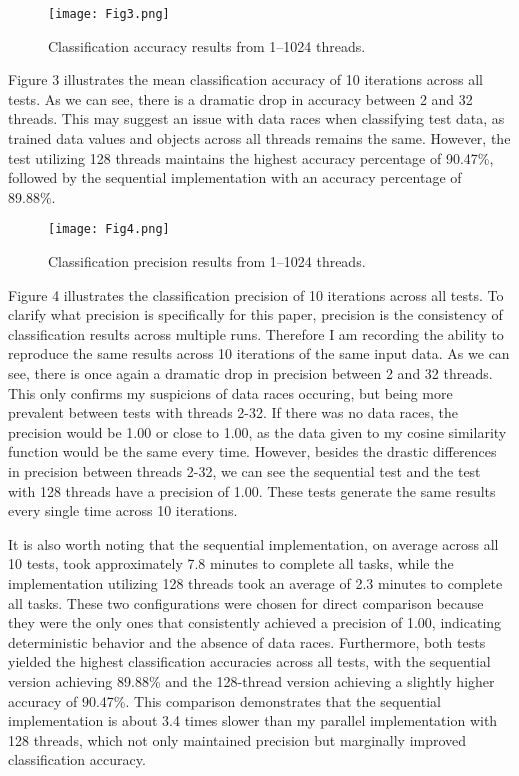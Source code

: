 \documentclass[conference]{IEEEtran}
\begin{document}
\begin{figure}[htbp]
\centerline{\texttt{[image: Fig3.png]}}
\caption{Classification accuracy results from 1--1024 threads.}
\label{fig}
\end{figure}

Figure 3 illustrates the mean classification accuracy of 10 iterations across all tests. As we can see, there is a dramatic drop in accuracy between 2 and 32 threads. This may suggest an issue with data races when classifying test data, as trained data values and objects across all threads remains the same. However, the test utilizing 128 threads maintains the highest accuracy percentage of 90.47\%, followed by the sequential implementation with an accuracy percentage of 89.88\%. 

\begin{figure}[htbp]
\centerline{\texttt{[image: Fig4.png]}}
\caption{Classification precision results from 1--1024 threads.}
\label{fig}
\end{figure}

Figure 4 illustrates the classification precision of 10 iterations across all tests. To clarify what precision is specifically for this paper, precision is the consistency of classification results across multiple runs. Therefore I am recording the ability to reproduce the same results across 10 iterations of the same input data. As we can see, there is once again a dramatic drop in precision between 2 and 32 threads. This only confirms my suspicions of data races occuring, but being more prevalent between tests with threads 2-32. If there was no data races, the precision would be 1.00 or close to 1.00, as the data given to my cosine similarity function would be the same every time. However, besides the drastic differences in precision between threads 2-32, we can see the sequential test and the test with 128 threads have a precision of 1.00. These tests generate the same results every single time across 10 iterations.

It is also worth noting that the sequential implementation, on average across all 10 tests, took approximately 7.8 minutes to complete all tasks, while the implementation utilizing 128 threads took an average of 2.3 minutes to complete all tasks. These two configurations were chosen for direct comparison because they were the only ones that consistently achieved a precision of 1.00, indicating deterministic behavior and the absence of data races. Furthermore, both tests yielded the highest classification accuracies across all tests, with the sequential version achieving 89.88\% and the 128-thread version achieving a slightly higher accuracy of 90.47\%. This comparison demonstrates that the sequential implementation is about 3.4 times slower than my parallel implementation with 128 threads, which not only maintained precision but marginally improved classification accuracy.
\end{document}
